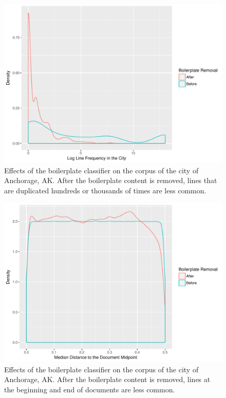 \documentclass[11pt]{article}
\begin{document}
\begin{figure}[htp]
    \centering
    \caption{Effects of the boilerplate classifier on the corpus of the city of Anchorage, AK. After the boilerplate content is removed, lines that are duplicated hundreds or thousands of times are less common.}
    \label{boilerplate_before_after3}
    \includegraphics[width=\linewidth]{figures/boilerplateBeforeAfterFreq.pdf}
\end{figure}
\begin{figure}[htp]
    \centering
    \caption{Effects of the boilerplate classifier on the corpus of the city of Anchorage, AK. After the boilerplate content is removed, lines at the beginning and end of documents are less common.}
    \label{boilerplate_before_after4}
    \includegraphics[width=\linewidth]{figures/boilerplateBeforeAfterMedianDocMidDist.pdf}
\end{figure}
\end{document}

